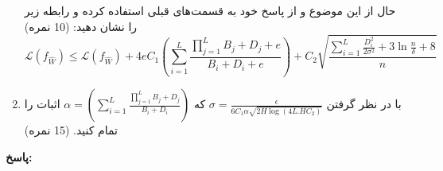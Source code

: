 \documentclass{article}
\begin{document}
\begin{enumerate}
حال از این موضوع و از پاسخ خود به قسمت‌های قبلی استفاده کرده و رابطه زیر را نشان دهید:
(10 نمره)
\begin{equation}
    \mathcal{L}(f_{\hat{W}}) \leq \hat{\mathcal{L}}(f_{\hat{W}}) + 4e C_1  (\sum_{i=1}^L
    \frac
    {\prod_{j=1}^{L} B_j + D_j +e}
    {B_i + D_i + e}
    ) + C_2 \sqrt{\frac
    {\sum_{i=1}^L \frac{D_i^2}{2\sigma^2} + 3 \ln {\frac{n}{\delta}} + 8}
    {n}}
\end{equation}

\item
با در نظر گرفتن
$\sigma = \frac
{\epsilon}
{6C_1 \alpha \sqrt{2H \log (4L.HC_2)}}$
که
$\alpha = (\sum_{i=1}^L
    \frac
    {\prod_{j=1}^{L} B_j + D_j}
    {B_i + D_i}
    )
$
اثبات را تمام کنید.
(15 نمره)

\end{enumerate}

\iffalse
\textbf{پاسخ:}
\end{document}
